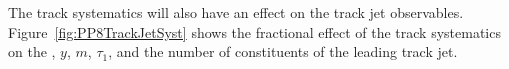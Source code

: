 The track systematics will also have an effect on the track jet observables. Figure~\ref{fig:PP8TrackJetSyst} shows the fractional effect of the track systematics on the \pt, $y$, $m$, $\tau_1$, and the number of constituents of the leading track jet.

\begin{figure}[h!]
  \centering
   \\
   \\

\end{figure}
